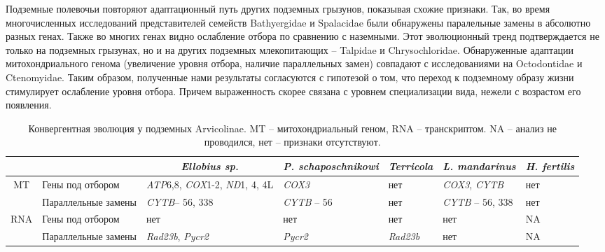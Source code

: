  Подземные полевочьи повторяют адаптационный путь других подземных грызунов, показывая схожие признаки. Так, во время многочисленных исследований представителей семейств Bathyergidae и  Spalacidae были обнаружены паралельные замены в абсолютно разных генах. Также во многих генах видно ослабление отбора по сравнению с наземными. Этот эволюционный тренд подтверждается не только на подземных грызунах, но и на других подземных млекопитающих --  Talpidae и Chrysochloridae. Обнаруженные адаптации митохондриального генома (увеличение уровня отбора, наличие параллельных замен) совпадают с исследованиями на Octodontidae и Ctenomyidae. Таким образом, полученные нами результаты согласуются с гипотезой о том, что переход к подземному образу жизни стимулирует ослабление уровня отбора. Причем выраженность скорее связана с уровнем специализации вида, нежели с возрастом его появления.


\begin{landscape}
	
	\begin{table}[]
		\caption{Конвергентная эволюция у подземных Arvicolinae. MT -- митохондриальный геном, RNA -- транскриптом. NA -- анализ не проводился, нет -- признаки отсутствуют.}\label{convergent} \vspace{5mm}
		
		\begin{tabular}{|c|p{5cm}|p{3.5cm}|p{3.5cm}|p{3.5cm}|p{3.5cm}|p{3.5cm}|}
			\hline
			&  & \multicolumn{1}{c|}{\textit{Ellobius sp.}} & \multicolumn{1}{c|}{\textit{P. schaposchnikowi}} & \multicolumn{1}{c|}{\textit{Terricola}} & \multicolumn{1}{c|}{\textit{L. mandarinus}} & \multicolumn{1}{c|}{\textit{H. fertilis}} \\ \hline
			\multirow{2}{*}{MT} & Гены под отбором & \textit{ATP}6,8,   \textit{COX}1-2, \textit{ND}1, 4, 4L & \textit{COX3} & нет & \textit{COX3}, \textit{CYTB} & нет \\ \cline{2-7}
			& Параллельные   замены & \textit{CYTB}– 56, 338 & \textit{CYTB} – 56 & нет & \textit{CYTB} – 56, 338 & нет \\ \hline
			\multirow{2}{*}{RNA} & Гены под отбором & нет & нет & нет & нет & NA \\ \cline{2-7}
			& Параллельные   замены &  \textit{Rad23b}, \textit{Pycr2} & \textit{Pycr2}& \textit{Rad23b} & нет & NA \\ \hline
		\end{tabular}
	\end{table}
	
\end{landscape}


